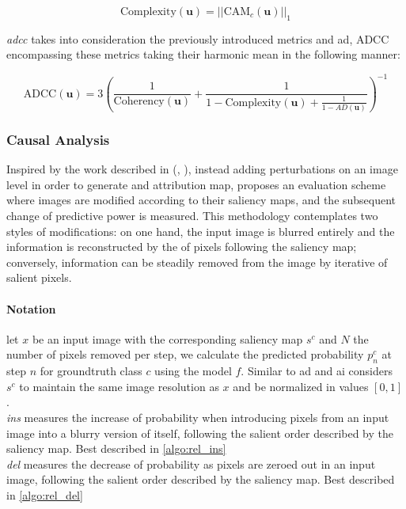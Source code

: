 \begin{equation}
	\mbox{Complexity}(\mathbf{u}) = ||\mbox{CAM}_c(\mathbf{u})||_1
\end{equation}

\noindent \emph{\gls{adcc}} takes into consideration the previously introduced metrics and 
\gls{ad}, ADCC encompassing these metrics taking their harmonic mean in the following manner:

\begin{equation}
	\mbox{ADCC}(\mathbf{u}) = 3\left(\frac{1}{\mbox{Coherency}(\mathbf{u})} + 
	                           \frac{1}{1-\mbox{Complexity}(\mathbf{u}) + 
							   \frac{1}{1-AD(\mathbf{u})}}\right)^{-1}
\end{equation}
\subsubsection{Causal Analysis} 
\label{sec:causal_metrics}
Inspired by the work described in (\cite{fong2017interpretable}, \cite{fong2019understanding}), 
instead adding perturbations on an image level in order to generate 
and attribution map, \cite{petsiuk2018rise} proposes an evaluation scheme where images are modified 
according to their saliency maps, and the subsequent change of predictive power is measured. This 
methodology contemplates two styles of modifications: on one hand, the input image is blurred 
entirely and the information is reconstructed by the  of pixels following the 
saliency map; conversely, information can be steadily removed from the image by iterative
 of salient pixels.\\

\paragraph{Notation} let $x$ be an input image with the corresponding saliency map $s^c$ and $N$ the 
number of pixels removed per step, we calculate the predicted probability $p^c_n$ at step $n$ for 
groundtruth class $c$ using the model $f$.  Similar to \gls{ad} and \gls{ai} \cite{petsiuk2018rise} 
considers $s^c$ to maintain the same image resolution as $x$ and be normalized in values $[0,1]$.\\

\noindent \emph{\gls{ins}} measures the increase of probability when introducing pixels from an 
input image into a blurry version of itself, following the salient order described by the saliency 
map. Best described in \autoref{algo:rel_ins}\\

\noindent \emph{\gls{del}} measures the decrease of probability as pixels are zeroed out in an input 
image, following the salient order described by the saliency map. Best 
described in \autoref{algo:rel_del}\\


